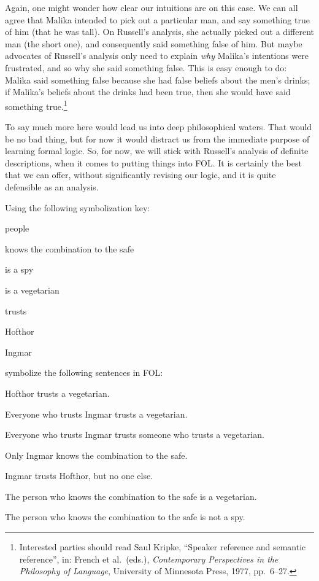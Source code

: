 Again, one might wonder how clear our intuitions are on this case. We can all agree that Malika intended to pick out a particular man, and say something true of him (that he was tall). On Russell's analysis, she actually picked out a different man (the short one), and consequently said something false of him. But  maybe advocates of Russell's analysis only need to explain \emph{why} Malika's intentions were frustrated, and so why she said something false. This is easy enough to do:  Malika said something false because she had false beliefs about the men's drinks; if Malika's beliefs about the drinks had been true,  then she would have said something true.\footnote{Interested parties should read Saul Kripke, ``Speaker reference and semantic reference'', in: French et al.\ (eds.), \textit{Contemporary Perspectives in the Philosophy of Language}, University of Minnesota Press, 1977, pp.\ 6--27.}

To say much more here would lead us into deep philosophical waters. That would be no bad thing, but for now it would distract us from the immediate purpose of learning formal logic. So, for now, we will stick with Russell's analysis of definite descriptions, when it comes to putting things into FOL. It is certainly the best that we can offer, without significantly revising our logic, and it is quite defensible as an analysis.

\practiceproblems

\problempart
Using the following symbolization key:
\begin{ekey}
\item[\text{domain}] people
\item[\atom{K}{x}]  knows the combination to the safe
\item[\atom{S}{x}]  is a spy
\item[\atom{V}{x}]  is a vegetarian
\item[\atom{T}{x,y}]  trusts 
\item[h] Hofthor
\item[i] Ingmar
\end{ekey}
symbolize the following sentences in FOL:
\begin{compactlist}
\item Hofthor trusts a vegetarian.
\item Everyone who trusts Ingmar trusts a vegetarian.
\item Everyone who trusts Ingmar trusts someone who trusts a vegetarian.
\item Only Ingmar knows the combination to the safe.
\item Ingmar trusts Hofthor, but no one else.
\item The person who knows the combination to the safe is a vegetarian.
\item The person who knows the combination to the safe is not a spy.
\end{compactlist}


